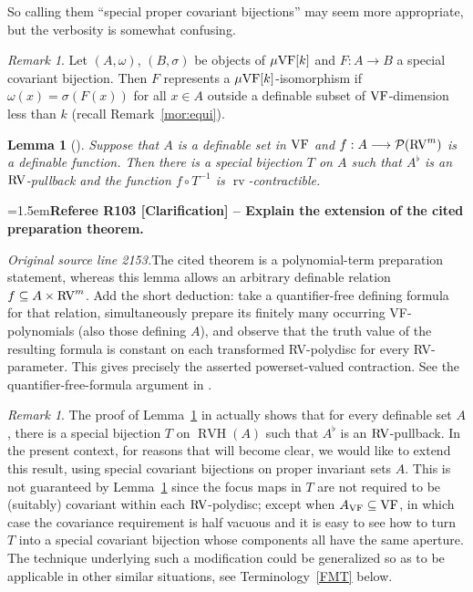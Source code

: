 \documentclass[12pt]{amsart}
\newcommand{\RefereeRemark}[4]{%
  \par\medskip\begingroup\normalfont\small\color{RefereePurple}%
  \emergencystretch=1.5em\noindent\textbf{Referee R#1 [#2] -- #3.}\par\nobreak\noindent #4\par
  \endgroup\medskip
}
\theoremstyle{plain}
\newtheorem{lem}[thm]{Lemma}
\theoremstyle{definition}
\theoremstyle{remark}
\newtheorem{rem}[thm]{Remark}
\numberwithin{equation}{section}
\theoremstyle{plain}
\newcommand{\VF}{\textup{VF}}
\newcommand{\RV}{\textup{RV}}
\newcommand{\0}{\emptyset}
\newcommand{\mdl}[1]{\mathcal{#1}}  %
\newcommand{\fun}{\longrightarrow}
\newcommand{\sub}{\subseteq}
\newcommand{\mgVF}{{\mu} {\VF}}
\DeclareMathOperator{\rv}{rv}
\DeclareMathOperator{\RVH}{RVH}
\begin{document}
So calling them ``special proper covariant bijections'' may seem more appropriate, but the verbosity is somewhat confusing.


\begin{rem}\label{spec:is:iso}
Let $(A,\omega)$, $(B, \sigma)$ be objects of $\mgVF[k]$ and $F : A \fun B$ a special covariant bijection. Then  $F$ represents a $\mgVF[k]$-isomorphism if $\omega(x) = \sigma(F(x))$ for all $x \in A$ outside a definable subset of $\VF$-dimension less than $k$ (recall Remark~\ref{mor:equi}).
\end{rem}



\begin{lem}[{\cite[Theorem~5.5]{Yin:special:trans}}]\label{special:bi:term:constant}
Suppose that $A$ is a definable set in $\VF$ and $f : A \fun \mdl P(\RV^m)$ is a definable function. Then there is a special bijection $T$ on $A$ such that $A^\flat$ is an $\RV$-pullback and the function $f \circ T^{-1}$ is $\rv$-contractible.
\end{lem}

\RefereeRemark{103}{Clarification}{Explain the extension of the cited preparation theorem}{%
\textit{Original source line 2153.}\quad The cited theorem is a polynomial-term preparation statement, whereas this lemma allows an arbitrary definable relation $f\subseteq A\times\RV^m$. Add the short deduction: take a quantifier-free defining formula for that relation, simultaneously prepare its finitely many occurring VF-polynomials (also those defining $A$), and observe that the truth value of the resulting formula is constant on each transformed RV-polydisc for every RV-parameter. This gives precisely the asserted powerset-valued contraction. See the quantifier-free-formula argument in \cite[Theorem~5.5 and Corollary~5.6]{Yin:special:trans}.
}

\begin{rem}\label{special:pseudo}
The proof of Lemma~\ref{special:bi:term:constant} in \cite{Yin:special:trans} actually shows that for every definable set $A$, there is a special bijection $T$ on  $\RVH(A)$  such that $A^{\flat}$ is an $\RV$-pullback. In the present context, for reasons that will become clear, we would like to extend this result, using special covariant bijections  on proper invariant sets $A$. This is not guaranteed by Lemma~\ref{special:bi:term:constant} since the focus maps in $T$ are not required to be (suitably) covariant within each $\RV$-polydisc; except when $A_{\VF} \sub \VF$, in which case  the covariance requirement is half vacuous and it is easy to see how to turn $T$ into a special covariant bijection whose components all have the same aperture. The technique underlying such a modification could be generalized so as to be applicable in other similar situations, see  Terminology~\ref{FMT} below.
\end{rem}
\end{document}
